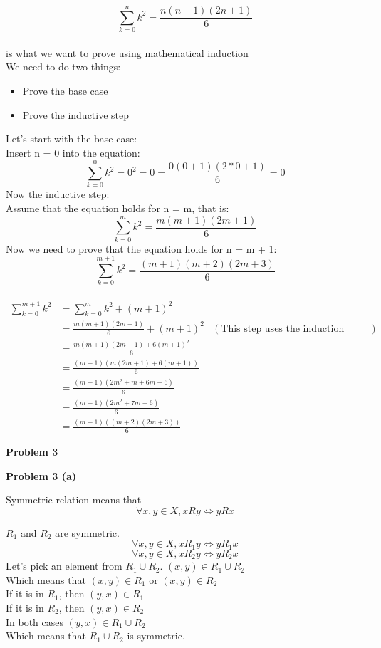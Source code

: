 \documentclass{article}
\begin{document}
\[
   \sum_{k=0}^{n} k^2 = \frac{n(n+1)(2n+1)}{6}
\]
\\
is what we want to prove using mathematical induction \\
We need to do two things: \\
\begin{itemize}
   \item Prove the base case
   \item Prove the inductive step
\end{itemize}
Let's start with the base case: \\
Insert n = 0 into the equation:
\[
   \sum_{k=0}^{0} k^2 = 0^2 = 0 = \frac{0(0+1)(2*0+1)}{6} = 0
\]
Now the inductive step: \\
Assume that the equation holds for n = m, that is:
\[
   \sum_{k=0}^{m} k^2 = \frac{m(m+1)(2m+1)}{6}
\]
Now we need to prove that the equation holds for n = m + 1:
\[
   \sum_{k=0}^{m+1} k^2 = \frac{(m+1)(m+2)(2m+3)}{6}
\]
\\
\begin{align*}
   \sum_{k=0}^{m+1} k^2 & = \sum_{k=0}^{m} k^2 + (m+1)^2     \\
                        & = \frac{m(m+1)(2m+1)}{6} + (m+1)^2 & (\text{This step uses the induction assumption}) \\
                        &= \frac{m(m+1)(2m+1) + 6 (m+1)^2}{6} \\
                        &= \frac{(m+1)(m(2m+1)+6(m+1))}{6} \\
                        &= \frac{(m+1)(2m^2+m+6m+6)}{6} \\
                        &= \frac{(m+1)(2m^2+7m+6)}{6} \\
                        &= \frac{(m+1)((m+2)(2m+3))}{6}
\end{align*}

\begin{flushleft}
   \textbf{\Large Problem 3}
\end{flushleft}


\begin{flushleft}
   \textbf{\large Problem 3 (a)}
\end{flushleft}

Symmetric relation means that
\[
   \forall x, y \in X, xRy \iff yRx
\]

$R_1$ and $R_2$ are symmetric. \\
\[
   \forall x, y \in X, xR_1y \iff yR_1x
\]
\[ 
   \forall x, y \in X, xR_2y \iff yR_2x
\]
Let's pick an element from $R_1 \cup R_2$. $(x, y) \in R_1 \cup R_2$ \\
Which means that $(x, y) \in R_1$ or $(x, y) \in R_2$ \\
If it is in $R_1$, then $(y, x) \in R_1$ \\
If it is in $R_2$, then $(y, x) \in R_2$ \\
In both cases $(y, x) \in R_1 \cup R_2$ \\
Which means that $R_1 \cup R_2$ is symmetric. \\
\end{document}
